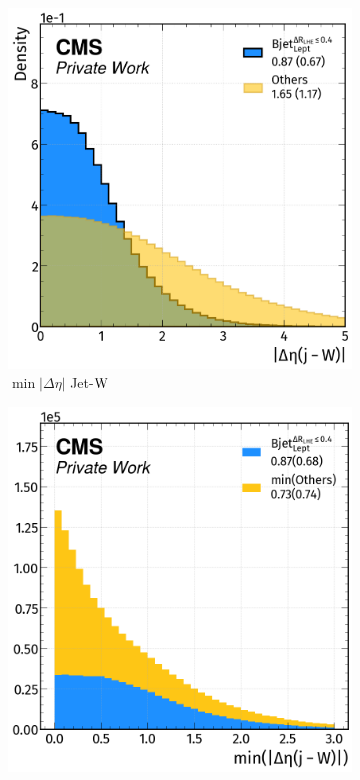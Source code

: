 \begin{figure}[H]
    \ContinuedFloat
    \vspace{-0.5cm}
    \centering
   \begin{subfigure}{0.49\linewidth}
        \centering
        \includegraphics[width=1\linewidth]{fig//chap08-kin_reco/deta_W.png}
        \caption{$\min|\Delta \eta|$ Jet-${\text{W}}$}
    \end{subfigure}
    \hfill
    \begin{subfigure}{0.4825\linewidth}  
        \centering
        \includegraphics[width=1\linewidth]{fig//chap08-kin_reco/min_deta_W.png}

\end{subfigure}
\end{figure}
